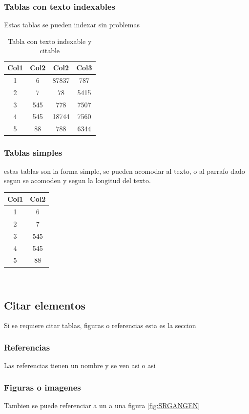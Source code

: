 \documentclass[journal]{IEEEtran}
\begin{document}
\subsubsection{Tablas con texto indexables}
Estas tablas se pueden indexar sin problemas
\begin{table}[H]
    \centering
    \begin{tabular}{||c c c c||} 
     \hline
     Col1 & Col2 & Col2 & Col3 \\ [0.5ex] 
     \hline
     1 & 6 & 87837 & 787 \\ 
     2 & 7 & 78 & 5415 \\
     3 & 545 & 778 & 7507 \\
     4 & 545 & 18744 & 7560 \\
     5 & 88 & 788 & 6344 \\ [1ex] 
     \hline
    \end{tabular}
    \caption{Tabla con texto indexable y citable}
    \label{tabla:1}
    \end{table}
\subsubsection{Tablas simples}
estas tablas son la forma simple, se pueden acomodar al texto,
o al parrafo dado segun se acomoden y segun la longitud del texto.
\begin{tabular}{||c c||} 
    \hline
    Col1 & Col2 \\ [0.5ex] 
    \hline
    1 & 6  \\ 
    2 & 7 \\
    3 & 545 \\
    4 & 545 \\
    5 & 88  \\ [1ex] 
    \hline
\end{tabular}
\\
\subsection{Citar elementos}
Si se requiere citar tablas, figuras o referencias esta es la seccion
\subsubsection{Referencias}
Las referencias tienen un nombre y se ven asi \cite{ledig} o asi \cite[Trabajo de ledig]{ledig}
\subsubsection{Figuras o imagenes}
Tambien se puede referenciar a un a una figura \ref{fig:SRGANGEN}
\end{document}
